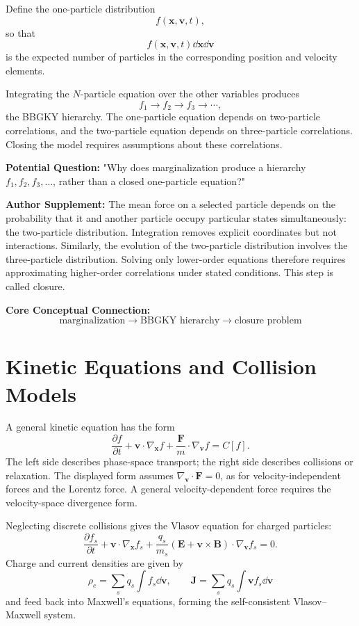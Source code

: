 Define the one-particle distribution
\[
f(\bm x,\bm v,t),
\]
so that
\[
f(\bm x,\bm v,t)\dd\bm x\dd\bm v
\]
is the expected number of particles in the corresponding position and velocity elements.

Integrating the \(N\)-particle equation over the other variables produces
\[
f_1\longrightarrow f_2\longrightarrow f_3\longrightarrow\cdots,
\]
the BBGKY hierarchy. The one-particle equation depends on two-particle correlations, and the two-particle equation depends on three-particle correlations. Closing the model requires assumptions about these correlations.

\begin{authornote}
\textbf{Potential Question:}
"Why does marginalization produce a hierarchy \(f_1,f_2,f_3,\dots\), rather than a closed one-particle equation?"

\textbf{Author Supplement:}
The mean force on a selected particle depends on the probability that it and another particle occupy particular states simultaneously: the two-particle distribution. Integration removes explicit coordinates but not interactions. Similarly, the evolution of the two-particle distribution involves the three-particle distribution. Solving only lower-order equations therefore requires approximating higher-order correlations under stated conditions. This step is called closure.

\textbf{Core Conceptual Connection:}
\[
\text{marginalization}
\longrightarrow
\text{BBGKY hierarchy}
\longrightarrow
\text{closure problem}
\]
\end{authornote}

\section{Kinetic Equations and Collision Models}
A general kinetic equation has the form
\[
\frac{\partial f}{\partial t}
+\bm v\cdot\nabla_{\bm x}f
+\frac{\bm F}{m}\cdot\nabla_{\bm v}f
=C[f].
\]
The left side describes phase-space transport; the right side describes collisions or relaxation. The displayed form assumes $\nabla_{\bm v}\cdot\bm F=0$, as for velocity-independent forces and the Lorentz force. A general velocity-dependent force requires the velocity-space divergence form.

Neglecting discrete collisions gives the Vlasov equation for charged particles:
\[
\frac{\partial f_s}{\partial t}
+\bm v\cdot\nabla_{\bm x}f_s
+\frac{q_s}{m_s}
(\bm E+\bm v\times\bm B)\cdot\nabla_{\bm v}f_s=0.
\]
Charge and current densities are given by
\[
\rho_c=\sum_s q_s\int f_s\dd\bm v,
\qquad
\bm J=\sum_s q_s\int \bm v f_s\dd\bm v
\]
and feed back into Maxwell's equations, forming the self-consistent Vlasov--Maxwell system.

